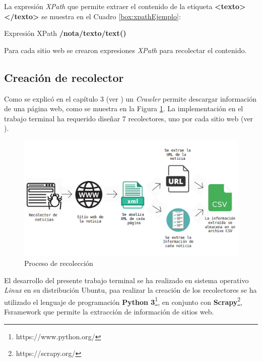 La expresión \textit{XPath} que permite extraer el contenido de la etiqueta \textbf{<texto> </texto>} se muestra en el Cuadro \ref{box:xpathEjemplo}: \\

\begin{mygraybox}[label={box:xpathEjemplo}]{Expresión XPath} 
\textbf{/nota/texto/text()}
\end{mygraybox}

Para cada sitio web se crearon expresiones \textit{XPath} para recolectar el contenido.

\subsection{Creación de recolector}

Como se explicó en el capítulo 3 (ver ) un \textit{Crawler} permite descargar información de una página web, como se muestra en la Figura \ref{Fig:recoleccion}. La implementación en el trabajo terminal ha requerido diseñar 7 recolectores, uno por cada sitio web (ver ). \\

\begin{figure}[H]
	\centering
	\includegraphics[scale=.25]{imagenes/Capitulo5/recoleccion.png}
	\caption{Proceso de recolección}
	\label{Fig:recoleccion}
\end{figure}

El desarrollo del presente trabajo terminal se ha realizado en sistema operativo \textit{Linux} en su distribución Ubuntu, paa realizar la creación de los recolectores se ha utilizado el lenguaje de programación \textbf{Python 3}\footnote{https://www.python.org/}, en conjunto con \textbf{Scrapy}\footnote{https://scrapy.org/}, Fsramework que permite la extracción de información de sitios web. 

